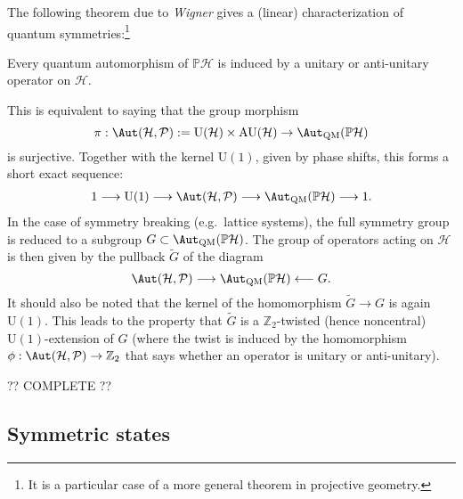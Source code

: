     The following theorem due to \textit{Wigner} gives a (linear) characterization of quantum symmetries:\footnote{It is a particular case of a more general theorem in projective geometry.}
    \begin{theorem}[Wigner]
        Every quantum automorphism of $\mathbb{P}\mathcal{H}$ is induced by a unitary or anti-unitary operator on $\mathcal{H}$.
    \end{theorem}
    This is equivalent to saying that the group morphism \[\pi:\Aut(\mathcal{H},\mathcal{P}):=\mathrm{U}(\mathcal{H})\times\mathrm{AU}(\mathcal{H})\rightarrow\Aut_\mathrm{QM}(\mathbb{P}\mathcal{H})\] is surjective. Together with the kernel $\mathrm{U}(1)$, given by phase shifts, this forms a short exact sequence:
    \begin{gather}
        1\longrightarrow\mathrm{U}(1)\longrightarrow\Aut(\mathcal{H},\mathcal{P})\longrightarrow\Aut_\mathrm{QM}(\mathbb{P}\mathcal{H})\longrightarrow1.
    \end{gather}
    In the case of symmetry breaking (e.g.~lattice systems), the full symmetry group is reduced to a subgroup $G\subset\Aut_\mathrm{QM}(\mathbb{P}\mathcal{H})$. The group of operators acting on $\mathcal{H}$ is then given by the pullback $\widetilde{G}$ of the diagram \[\Aut(\mathcal{H}, \mathcal{P})\longrightarrow\Aut_\mathrm{QM}(\mathbb{P}\mathcal{H})\longleftarrow G.\] It should also be noted that the kernel of the homomorphism $\widetilde{G}\rightarrow G$ is again $\mathrm{U}(1)$. This leads to the property that $\widetilde{G}$ is a $\mathbb{Z}_2$-twisted (hence noncentral) $\mathrm{U}(1)$-extension of $G$ (where the twist is induced by the homomorphism $\phi:\Aut(\mathcal{H},\mathcal{P})\rightarrow\mathbb{Z}_2$ that says whether an operator is unitary or anti-unitary).

    ?? COMPLETE ??

\subsection{Symmetric states}

